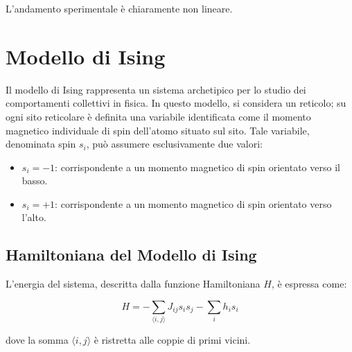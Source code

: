 L’andamento sperimentale è chiaramente non lineare.


\section{Modello di Ising}

Il modello di Ising rappresenta un sistema archetipico per lo studio dei comportamenti collettivi in fisica.
In questo modello, si considera un reticolo; su ogni sito reticolare è definita una variabile identificata come il momento magnetico individuale di spin dell'atomo situato sul sito. Tale variabile, denominata spin $s_i$, può assumere esclusivamente due valori:

\begin{itemize}
    \item $s_i = -1$: corrispondente a un momento magnetico di spin orientato verso il basso.
    \item $s_i = +1$: corrispondente a un momento magnetico di spin orientato verso l'alto.
\end{itemize}

\subsection*{Hamiltoniana del Modello di Ising}
L'energia del sistema, descritta dalla funzione Hamiltoniana $H$, è espressa come:

\begin{equation} \label{eq:ch16_13}
H = -\sum_{\langle i,j \rangle} J_{ij} s_i s_j - \sum_i h_i s_i 
\end{equation}

dove la somma $\langle i,j \rangle$ è ristretta alle coppie di primi vicini.

